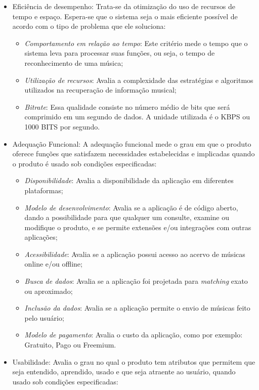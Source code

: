 \begin{itemize}
    \item Eficiência de desempenho: Trata-se da otimização do uso de recursos de tempo e espaço. Espera-se que o sistema seja o mais eficiente possível de acordo com o tipo de problema que ele soluciona:
    \begin{itemize}
        \item \textit{Comportamento em relação ao tempo}: Este critério mede o tempo que o sistema leva para processar suas funções, ou seja, o tempo de reconhecimento de uma música;
        \item \textit{Utilização de recursos}: Avalia a complexidade das estratégias e algoritmos utilizados na recuperação de informação musical;
        \item \textit{Bitrate}: Essa qualidade consiste no número médio de bits que será comprimido em um segundo de dados. A unidade utilizada é o KBPS ou 1000 BITS por segundo.
    \end{itemize}
    \item Adequação Funcional: A adequação funcional mede o grau em que o produto oferece funções que satisfazem necessidades estabelecidas e implicadas quando o produto é usado sob condições especificadas:
    \begin{itemize}
        \item \textit{Disponibilidade}: Avalia a disponibilidade da aplicação em diferentes plataformas;
        \item \textit{Modelo de desenvolvimento}: Avalia se a aplicação é de código aberto, dando a possibilidade para que qualquer um consulte, examine ou modifique o produto, e se permite extensões e/ou integrações com outras aplicações;
        \item \textit{Acessibilidade}: Avalia se a aplicação possui acesso ao acervo de músicas online e/ou offline;
        \item \textit{Busca de dados}: Avalia se a aplicação foi projetada para \textit{matching} exato ou aproximado;
        \item \textit{Inclusão da dados}: Avalia se a aplicação permite o envio de músicas feito pelo usuário;
        \item \textit{Modelo de pagamento}: Avalia o custo da aplicação, como por exemplo: Gratuito, Pago ou Freemium.
    \end{itemize}
    \item Usabilidade: Avalia o grau no qual o produto tem atributos que permitem que seja entendido, aprendido, usado e que seja atraente ao usuário, quando usado sob condições especificadas:

\end{itemize}
